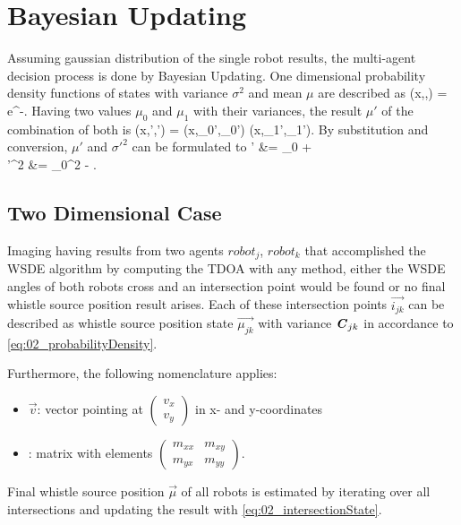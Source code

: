 \section{Bayesian Updating}
\label{sec:02_filter}

Assuming gaussian distribution of the single robot results,
the multi-agent decision process is done by Bayesian Updating.
One dimensional probability density functions of states with
variance $\sigma^2$ and mean $\mu$ are described as
\bal
    (x,\sigma,\mu) = e^{-}.
    \label{eq:02_probabilityDensity}
\eal
Having two values $\mu_0$ and $\mu_1$ with their variances,
the result $\mu'$ of the combination of both is
\bal
    (x,\sigma',\mu') = (x,\sigma_0',\mu_0') \cdot {}(x,\sigma_1',\mu_1').
    \label{eq:02_newProbabilityDensity}
\eal
By substitution and conversion, $\mu'$ and $\sigma'^2$ can be
formulated to
\bsub
\label{eq:02_intersectionState}
\bal
    \mu' &= \mu_0 + \\
    \sigma'^2 &= \sigma_0^2 - .
\eal
\esub

\subsection{Two Dimensional Case}
\label{subsec:02_2dTeam}

Imaging having results from two agents $robot_j$, $robot_k$ that accomplished the \ac{WSDE} algorithm by
computing the \ac{TDOA} with any method, either the \ac{WSDE} angles of both robots
cross and an intersection point would be found or no final whistle source position result arises.
Each of these intersection points $\vec{i_{jk}}$ can be described as whistle source position
state $\vec{\mu_{jk}}$ with variance $\textbf{\textit{C}}_{jk}$ in accordance to \cref{eq:02_probabilityDensity}.

Furthermore, the following nomenclature applies:
\begin{itemize}
\item $\vec{v}$: vector pointing at $\left( \begin{matrix} v_x \\ v_y \end{matrix} \right)$ in
      x- and y-coordinates
\item {}: matrix with elements $\left( \begin{matrix} m_{xx} & m_{xy} \\ m_{yx} & m_{yy} \end{matrix} \right)$.
\end{itemize}
Final whistle source position $\vec{\mu}$ of all robots is estimated by iterating over
all intersections and updating the result with \cref{eq:02_intersectionState}.

